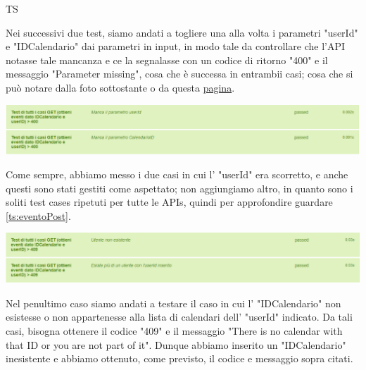 \begin{listaPersonale}{TS}
\begin{center}
                \end{center}
                Nei successivi due test, siamo andati a togliere una alla volta i parametri "userId" e "IDCalendario" dai parametri in input, in modo tale da controllare che l'API notasse tale mancanza e ce la segnalasse con un codice di ritorno "400" e il messaggio "Parameter missing", cosa che è successa in entrambii casi; cosa che si può notare dalla foto sottostante o da questa \href{https://plan-it.it/test-report.html} {pagina}.
                \begin{center}
                        \includegraphics[width=1\textwidth, height=0.09\textheight]{img/png/tests/EventoGet/400_missingParameter_getEventi.png}
                \end{center}
                Come sempre, abbiamo messo i due casi in cui l' "userId" era scorretto, e anche questi sono stati gestiti come aspettato; non aggiungiamo altro, in quanto sono i soliti test cases ripetuti per tutte le APIs, quindi per approfondire guardare \ref{ts:eventoPost}.
                \begin{center}
                        \includegraphics[width=1\textwidth, height=0.09\textheight]{img/png/tests/EventoGet/409_userId_getEventi.png}
                \end{center}
                Nel penultimo caso siamo andati a testare il caso in cui l' "IDCalendario" non esistesse o  non appartenesse alla lista di calendari dell' "userId" indicato. Da tali casi, bisogna ottenere il codice "409" e il messaggio "There is no calendar with that ID or you are not part of it". Dunque abbiamo inserito un "IDCalendario" inesistente e abbiamo ottenuto, come previsto, il codice e messaggio sopra citati.

\end{listaPersonale}

